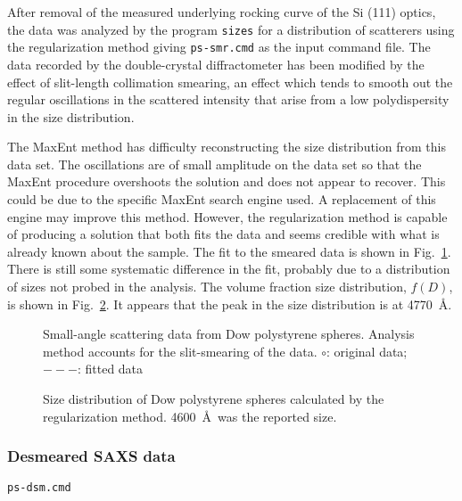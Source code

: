 \documentclass[letterpaper]{article}
\begin{document}
After removal of the measured underlying 
rocking curve of the Si (111) optics, the data was 
analyzed by the program \texttt{sizes} for a 
distribution of scatterers using the regularization 
method giving \texttt{ps-smr.cmd} as the input command 
file.  The data recorded by the double-crystal 
diffractometer has been modified by the effect of 
slit-length collimation smearing, an effect which 
tends to smooth out the regular oscillations in the 
scattered intensity that arise from a low 
polydispersity in the size distribution.

The MaxEnt method has difficulty reconstructing the 
size distribution from this data set.  The 
oscillations are of small amplitude on the data set 
so that the MaxEnt procedure overshoots the solution 
and does not appear to recover.  This could be due to 
the specific MaxEnt search engine used.  A 
replacement of this engine may improve this method.  
However, the regularization method is capable of 
producing a solution that both fits the data and 
seems credible with what is already known about the 
sample.  The fit to the smeared data is shown in 
Fig.~\ref{f:ps-smr.fit}.  There is still some 
systematic difference in the fit, probably due to a 
distribution of sizes not probed in the analysis.
The volume fraction size 
distribution, $f(D)$, is shown in 
Fig.~\ref{f:ps-smr.f-D}.  It appears that the peak in 
the size distribution is at 4770~\AA.

\begin{figure}[tbp]
 \caption{Small-angle scattering data from 
    Dow polystyrene spheres.  Analysis method 
    accounts for the slit-smearing of the data.  
    $\circ$: original data;
    $---$: fitted data}%
 \protect\label{f:ps-smr.fit}
\end{figure}

\begin{figure}[tbp]
 \caption{Size distribution of Dow polystyrene spheres
    calculated by the regularization method.  
    4600~\AA\ was the reported size.}
 \protect\label{f:ps-smr.f-D}
\end{figure}

\subsubsection{Desmeared SAXS data}
{\texttt{ps-dsm.cmd}}
\end{document}
